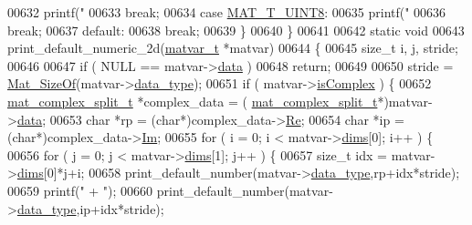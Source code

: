 \begin{DoxyCode}
{{{{{{{{{{{{{{{{{{{{{{{{{{{{{{{{{{{00632             printf(\textcolor{stringliteral}{"%
00633             \textcolor{keywordflow}{break};
00634         \textcolor{keywordflow}{case} \hyperlink{group___m_a_t_ggacf7b3b879282b7ab3a51190e49bf3453a01c1bd7db68f90552862eb5d311be408}{MAT\_T\_UINT8}:
00635             printf(\textcolor{stringliteral}{"%
00636             \textcolor{keywordflow}{break};
00637         \textcolor{keywordflow}{default}:
00638             \textcolor{keywordflow}{break};
00639     \}
00640 \}
00641 
00642 \textcolor{keyword}{static} \textcolor{keywordtype}{void}
00643 print\_default\_numeric\_2d(\hyperlink{group___m_a_t_structmatvar__t}{matvar\_t} *matvar)
00644 \{
00645     \textcolor{keywordtype}{size\_t} i, j, stride;
00646 
00647     \textcolor{keywordflow}{if} ( NULL == matvar->\hyperlink{group___m_a_t_a5672978efa230bbdecdf38ede781f7fa}{data} )
00648         \textcolor{keywordflow}{return};
00649 
00650     stride = \hyperlink{group__mat__util_gab6774aabdc124c540c1e7686d0804940}{Mat\_SizeOf}(matvar->\hyperlink{group___m_a_t_ab6aafe9bd77f0f077852593dec438144}{data\_type});
00651     \textcolor{keywordflow}{if} ( matvar->\hyperlink{group___m_a_t_aeb03b3a69f108dc05470b00443a43739}{isComplex} ) \{
00652         \hyperlink{group___m_a_t_structmat__complex__split__t}{mat\_complex\_split\_t} *complex\_data = (
      \hyperlink{group___m_a_t_structmat__complex__split__t}{mat\_complex\_split\_t}*)matvar->\hyperlink{group___m_a_t_a5672978efa230bbdecdf38ede781f7fa}{data};
00653         \textcolor{keywordtype}{char} *rp = (\textcolor{keywordtype}{char}*)complex\_data->\hyperlink{group___m_a_t_a484a93607508adac2bce53a0252e0325}{Re};
00654         \textcolor{keywordtype}{char} *ip = (\textcolor{keywordtype}{char}*)complex\_data->\hyperlink{group___m_a_t_a7182d10b0d3598415887376065440946}{Im};
00655         for ( i = 0; i < matvar->\hyperlink{group___m_a_t_a8e01234e1c862ce3472bb37f5a09b92c}{dims}[0]; i++ ) \{
00656             \textcolor{keywordflow}{for} ( j = 0; j < matvar->\hyperlink{group___m_a_t_a8e01234e1c862ce3472bb37f5a09b92c}{dims}[1]; j++ ) \{
00657                 \textcolor{keywordtype}{size\_t} idx = matvar->\hyperlink{group___m_a_t_a8e01234e1c862ce3472bb37f5a09b92c}{dims}[0]*j+i;
00658                 print\_default\_number(matvar->\hyperlink{group___m_a_t_ab6aafe9bd77f0f077852593dec438144}{data\_type},rp+idx*stride);
00659                 printf(\textcolor{stringliteral}{" + "});
00660                 print\_default\_number(matvar->\hyperlink{group___m_a_t_ab6aafe9bd77f0f077852593dec438144}{data\_type},ip+idx*stride);
}}}}}}}}}}}}}}}}}}}}}}}}}}}}}}}}}}}}}
\end{DoxyCode}
